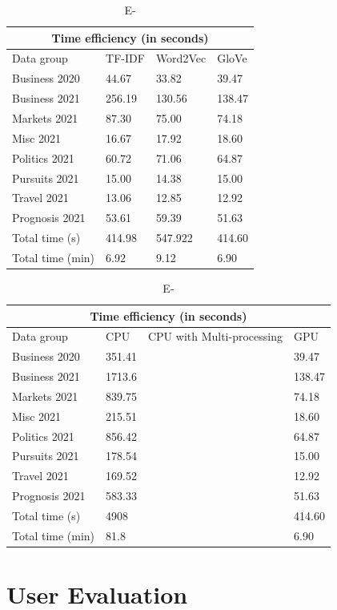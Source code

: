 \begin{table}[H]
\centering
\renewcommand{\arraystretch}{1.05}
\begin{tabularx}{0.9\textwidth}{X X X X} 
\multicolumn{4}{c}{Time efficiency (in seconds)} \\
 \hline
 Data group & TF-IDF & Word2Vec & GloVe \\
 \hline
 Business 2020 & 44.67& 33.82& 39.47 \\ 
 Business 2021 & 256.19 & 130.56 & 138.47 \\
 Markets 2021 & 87.30 & 75.00 & 74.18 \\
 Misc 2021 & 16.67 & 17.92 & 18.60 \\
 Politics 2021 & 60.72 & 71.06 & 64.87 \\
 Pursuits 2021 & 15.00 & 14.38 & 15.00 \\ 
 Travel 2021 & 13.06 & 12.85 & 12.92 \\
 Prognosis 2021 & 53.61 & 59.39 & 51.63 \\ 
 \hline
 Total time (s) & 414.98 & 547.922 & 414.60 \\ 
  Total time (min) & 6.92 & 9.12 & 6.90 \\ 
\end{tabularx}
\caption{E-}
\label{table:word_embed}
\end{table}


\begin{table}[H]
\centering
\renewcommand{\arraystretch}{1.05}
\begin{tabularx}{0.8\textwidth}{X X X X} 
\multicolumn{4}{c}{Time efficiency (in seconds)} \\
 \hline
 Data group & CPU & CPU with Multi-processing & GPU \\
 \hline
 Business 2020 & 351.41 & & 39.47 \\ 
 Business 2021 & 1713.6 & & 138.47 \\
 Markets 2021 & 839.75  & & 74.18\\
 Misc 2021 & 215.51 & & 18.60 \\
 Politics 2021 & 856.42  & & 64.87 \\
 Pursuits 2021 & 178.54 & & 15.00 \\ 
 Travel 2021 & 169.52 & & 12.92 \\
 Prognosis 2021 & 583.33  & & 51.63 \\ 
 \hline
 Total time (s) & 4908 & & 414.60 \\ 
 Total time (min) & 81.8  & & 6.90\\ 
\end{tabularx}

\caption{E-}
\label{table:cputime}
\end{table}

\section{User Evaluation} \label{s:user_eval}






